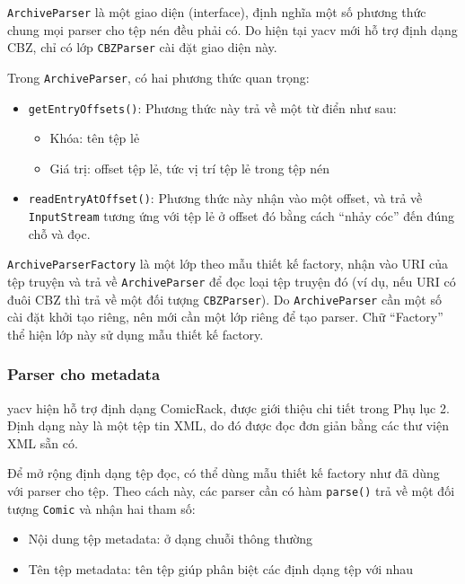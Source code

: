 \documentclass[../../../../thesis]{subfiles}
\begin{document}
\texttt{ArchiveParser} là một giao diện (interface), định nghĩa một số phương
thức chung mọi parser cho tệp nén đều phải có. Do hiện tại yacv mới hỗ trợ định
dạng CBZ, chỉ có lớp \texttt{CBZParser} cài đặt giao diện này.

Trong \texttt{ArchiveParser}, có hai phương thức quan trọng:

\begin{itemize}
    \item
        \texttt{getEntryOffsets()}: Phương thức này trả về một từ điển như sau:

        \begin{itemize}
            \item
                Khóa: tên tệp lẻ
            \item
                Giá trị: offset tệp lẻ, tức vị trí tệp lẻ trong tệp nén
        \end{itemize}
    \item
        \texttt{readEntryAtOffset()}: Phương thức này nhận vào một offset, và
        trả về \texttt{InputStream} tương ứng với tệp lẻ ở offset đó bằng cách
        ``nhảy cóc'' đến đúng chỗ và đọc.
\end{itemize}

\texttt{ArchiveParserFactory} là một lớp theo mẫu thiết kế factory, nhận
vào URI của tệp truyện và trả về \texttt{ArchiveParser} để đọc loại tệp truyện
đó (ví dụ, nếu URI có đuôi CBZ thì trả về một đối tượng \texttt{CBZParser}). Do
\texttt{ArchiveParser} cần một số cài đặt khởi tạo riêng, nên mới cần một lớp
riêng để tạo parser. Chữ ``Factory'' thể hiện lớp này sử dụng mẫu thiết kế
factory.

\subsubsection{Parser cho metadata}

yacv hiện hỗ trợ định dạng ComicRack, được giới thiệu chi tiết trong Phụ lục 2.
Định dạng này là một tệp tin XML, do đó được đọc đơn giản bằng các thư viện XML
sẵn có.

Để mở rộng định dạng tệp đọc, có thể dùng mẫu thiết kế factory như đã dùng với
parser cho tệp. Theo cách này, các parser cần có hàm \texttt{parse()} trả về một
đối tượng \texttt{Comic} và nhận hai tham số:

\begin{itemize}
    \item
        Nội dung tệp metadata: ở dạng chuỗi thông thường
    \item
        Tên tệp metadata: tên tệp giúp phân biệt các định dạng tệp với nhau
\end{itemize}
\end{document}
